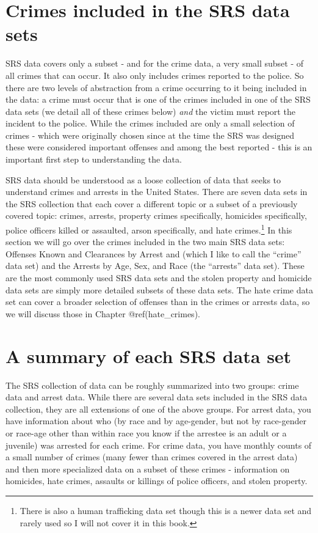 \documentclass[
]{krantz}
\begin{document}
\section{Crimes included in the SRS
data sets}\label{crimes-included-in-the-srs-data sets}

SRS data covers only a subset - and for the crime data, a
very small subset - of all crimes that can occur. It also
only includes crimes reported to the police. So there are
two levels of abstraction from a crime occurring to it being
included in the data: a crime must occur that is one of the
crimes included in one of the SRS data sets (we detail all of
these crimes below) \emph{and} the victim must report the
incident to the police. While the crimes included are only a
small selection of crimes - which were originally chosen
since at the time the SRS was designed these were considered
important offenses and among the best reported - this is an
important first step to understanding the data.

SRS data should be understood as a loose collection of data
that seeks to understand crimes and arrests in the United
States. There are seven data sets in the SRS collection that
each cover a different topic or a subset of a previously
covered topic: crimes, arrests, property crimes
specifically, homicides specifically, police officers killed
or assaulted, arson specifically, and hate
crimes.\footnote{There is also a human trafficking data set
  though this is a newer data set and rarely used so I will
  not cover it in this book.} In this section we will go
over the crimes included in the two main SRS data sets:
Offenses Known and Clearances by Arrest and (which I like to
call the ``crime'' data set) and the Arrests by Age, Sex, and
Race (the ``arrests'' data set). These are the most commonly
used SRS data sets and the stolen property and homicide
data sets are simply more detailed subsets of these data sets.
The hate crime data set can cover a broader selection of
offenses than in the crimes or arrests data, so we will
discuss those in Chapter @ref(hate\_crimes).

\section{A summary of each SRS
data set}\label{a-summary-of-each-srs-data set}

The SRS collection of data can be roughly summarized into
two groups: crime data and arrest data. While there are
several data sets included in the SRS data collection, they
are all extensions of one of the above groups. For arrest
data, you have information about who (by race and by
age-gender, but not by race-gender or race-age other than
within race you know if the arrestee is an adult or a
juvenile) was arrested for each crime. For crime data, you
have monthly counts of a small number of crimes (many fewer
than crimes covered in the arrest data) and then more
specialized data on a subset of these crimes - information
on homicides, hate crimes, assaults or killings of police
officers, and stolen property.
\end{document}
